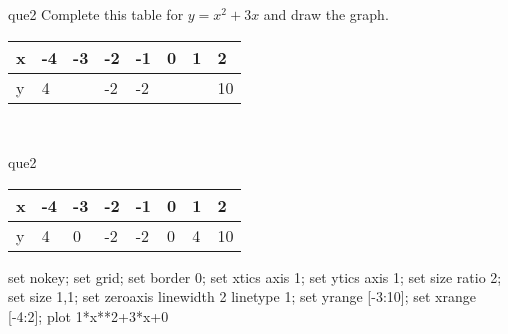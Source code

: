 \documentclass[13.5pt, varwidth=true]{beamer}
\begin{document}
\begin{frame}[shrink=19,fragile]
	\begin{beamercolorbox}[rounded=true, left, shadow=true,wd=14.8cm]{que2}
		 Complete this table for $y = x^{2} + 3x$ and draw the graph. \\[0.3cm] \renewcommand{\arraystretch}{1.2}\begin{tabular}{|C|C|C|C|C|C|C|C|} \hline x & -4 & -3 & -2 & -1 & 0 & 1 & 2 \\ \hline y & 4 &  & -2 & -2 &  &  & 10\\ \hline \end{tabular}\\[0.3cm]
	\end{beamercolorbox}
\end{frame}
\begin{frame}[shrink=19,fragile]
	\begin{beamercolorbox}[rounded=true, left, shadow=true,wd=14.8cm]{que2}
 		\renewcommand{\arraystretch}{1.2}\begin{tabular}{|C|C|C|C|C|C|C|C|} \hline x & -4 & -3 & -2 & -1 & 0 & 1 & 2 \\ \hline y & 4 & 0 & -2 & -2 & 0 & 4 & 10\\ \hline \end{tabular}\begin{gnuplot}[terminal=pdf] set nokey; set grid; set border 0; set xtics axis 1; set ytics axis 1; set size ratio 2; set size 1,1; set zeroaxis linewidth 2 linetype 1; set yrange [-3:10]; set xrange [-4:2]; plot 1*x**2+3*x+0 \end{gnuplot}
	\end{beamercolorbox}
\end{frame}
\end{document}

